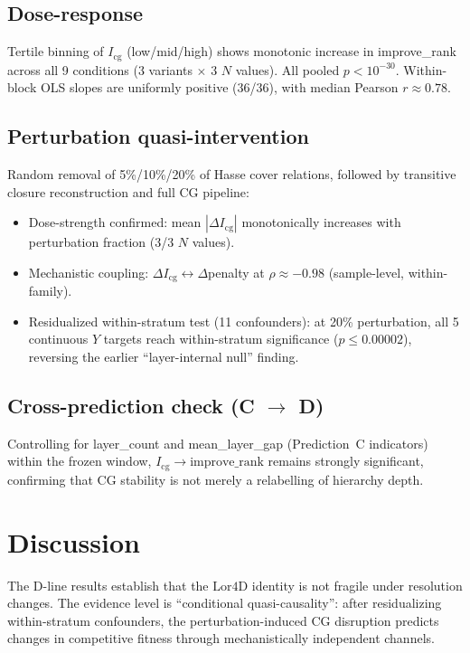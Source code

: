 \documentclass[12pt,a4paper]{article}
\newcommand{\Lor}{\mathrm{Lor4D}}
\newcommand{\Icg}{I_{\mathrm{cg}}}
\begin{document}
\subsection{Dose-response}

Tertile binning of $\Icg$ (low/mid/high) shows monotonic increase in
improve\_rank across all 9 conditions (3 variants $\times$ 3 $N$ values).
All pooled $p<10^{-30}$.
Within-block OLS slopes are uniformly positive (36/36), with median Pearson
$r\approx 0.78$.

\subsection{Perturbation quasi-intervention}

Random removal of 5\%/10\%/20\% of Hasse cover relations, followed by
transitive closure reconstruction and full CG pipeline:

\begin{itemize}
\item Dose-strength confirmed: mean $|\Delta\Icg|$ monotonically increases
  with perturbation fraction (3/3 $N$ values).
\item Mechanistic coupling: $\Delta\Icg \leftrightarrow \Delta$penalty at
  $\rho\approx -0.98$ (sample-level, within-family).
\item Residualized within-stratum test (11 confounders): at 20\% perturbation,
  all 5 continuous $Y$ targets reach within-stratum significance
  ($p\leq 0.00002$), reversing the earlier ``layer-internal null'' finding.
\end{itemize}

\subsection{Cross-prediction check (C $\to$ D)}

Controlling for layer\_count and mean\_layer\_gap (Prediction~C indicators)
within the frozen window, $\Icg\to\text{improve\_rank}$ remains strongly
significant, confirming that CG stability is not merely a relabelling of
hierarchy depth.

\section{Discussion}

The D-line results establish that the $\Lor$ identity is not fragile under
resolution changes.
The evidence level is ``conditional quasi-causality'': after residualizing
within-stratum confounders, the perturbation-induced CG disruption predicts
changes in competitive fitness through mechanistically independent channels.
\end{document}
